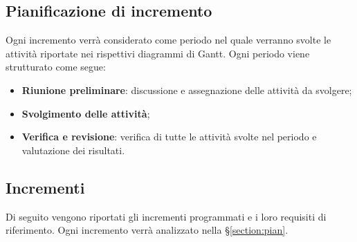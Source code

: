 \documentclass[../piano-di-progetto.tex]{subfiles}
\begin{document}
  \subsection{Pianificazione di incremento}
  Ogni incremento verrà considerato come periodo nel quale verranno svolte le attività riportate nei rispettivi diagrammi di Gantt. Ogni periodo viene strutturato come segue:
  \begin{itemize}
      \item \textbf{Riunione preliminare}: discussione e assegnazione delle attività da svolgere;
      \item \textbf{Svolgimento delle attività};
      \item \textbf{Verifica e revisione}: verifica di tutte le attività svolte nel periodo e valutazione dei risultati. 
  \end{itemize}

  \subsection{Incrementi}
  Di seguito vengono riportati gli incrementi programmati e i loro requisiti di riferimento. Ogni incremento verrà analizzato nella \S\ref{section:pian}.
\end{document}
